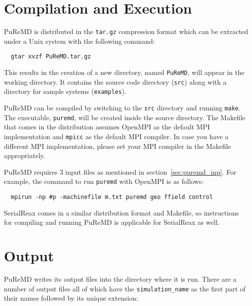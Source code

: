 \documentclass{article}
\begin{document}
\section{Compilation and Execution}
\label{sec:puremd_execute}

PuReMD is distributed in the {\tt tar.gz} compression format which can 
be extracted under a Unix system with the following command:
\begin{verbatim}
  gtar xvzf PuReMD.tar.gz
\end{verbatim}

This results in the creation of a new directory, named {\tt PuReMD}, will appear in the working 
directory. It contains the source code directory ({\tt src}) 
along with a directory for sample systems ({\tt examples}).

PuReMD can be compiled by switching to the {\tt src} directory and 
running {\tt make}. The executable, {\tt puremd}, will be created inside 
the source directory. The Makefile that comes in the distribution assumes 
OpenMPI as the default MPI implementation and {\tt mpicc} as the default 
MPI compiler. In case you have a different MPI implementation, 
please set your MPI compiler in the Makefile appropriately. 

PuReMD requires 3 input files as mentioned in section~\ref{sec:puremd_inp}. 
For example, the command to run {\tt puremd} with OpenMPI is as follows:
\begin{verbatim}
  mpirun -np #p -machinefile m.txt puremd geo ffield control
\end{verbatim}

SerialReax comes in a similar distribution format and Makefile,
so instructions for compiling and running PuReMD is applicable for 
SerialReax as well.


\section{Output}
\label{sec:puremd_output}

PuReMD writes its output files into the directory where it is run. 
There are a number of output files all of which have the 
{\tt simulation\_name} as the first part of their names followed 
by its unique extension:
\end{document}
